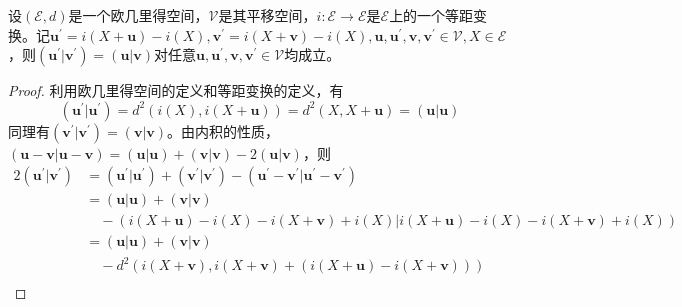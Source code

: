 \documentclass[main.tex]{subfiles}
\begin{document}
\begin{lemma}\label{thm:isom_l1}
    设$\left(\mathcal{E},d\right)$是一个欧几里得空间，$\mathcal{V}$是其平移空间，$i:\mathcal{E}\rightarrow\mathcal{E}$是$\mathcal{E}$上的一个等距变换。记$\mathbf{u}^\prime=i\left(X+\mathbf{u}\right)-i\left(X\right),\mathbf{v}^\prime=i\left(X+\mathbf{v}\right)-i\left(X\right),\mathbf{u},\mathbf{u}^\prime,\mathbf{v},\mathbf{v}^\prime\in\mathcal{V},X\in\mathcal{E}$，则$\left(\mathbf{u}^\prime|\mathbf{v}^\prime\right)=\left(\mathbf{u}|\mathbf{v}\right)$对任意$\mathbf{u},\mathbf{u}^\prime,\mathbf{v},\mathbf{v}^\prime\in\mathcal{V}$均成立。
\end{lemma}
\begin{proof}
    利用欧几里得空间的定义和等距变换的定义，有
    \[
        \left(\mathbf{u}^\prime|\mathbf{u}^\prime\right)=d^2\left(i\left(X\right),i\left(X+\mathbf{u}\right)\right)=d^2\left(X,X+\mathbf{u}\right)=\left(\mathbf{u}|\mathbf{u}\right)
    \]
    同理有$\left(\mathbf{v}^\prime|\mathbf{v}^\prime\right)=\left(\mathbf{v}|\mathbf{v}\right)$。由内积的性质，$\left(\mathbf{u}-\mathbf{v}|\mathbf{u}-\mathbf{v}\right)=\left(\mathbf{u}|\mathbf{u}\right)+\left(\mathbf{v}|\mathbf{v}\right)-2\left(\mathbf{u}|\mathbf{v}\right)$，则
    \begin{align*}
        2\left(\mathbf{u}^\prime|\mathbf{v}^\prime\right) & =\left(\mathbf{u}^\prime|\mathbf{u}^\prime\right)+\left(\mathbf{v}^\prime|\mathbf{v}^\prime\right)-\left(\mathbf{u}^\prime-\mathbf{v}^\prime|\mathbf{u}^\prime-\mathbf{v}^\prime\right)        \\
                                                          & =\left(\mathbf{u}|\mathbf{u}\right)+\left(\mathbf{v}|\mathbf{v}\right)                                                                                                                         \\
                                                          & \quad-\left(i\left(X+\mathbf{u}\right)-i\left(X\right)-i\left(X+\mathbf{v}\right)+i\left(X\right)|i\left(X+\mathbf{u}\right)-i\left(X\right)-i\left(X+\mathbf{v}\right)+i\left(X\right)\right) \\
                                                          & =\left(\mathbf{u}|\mathbf{u}\right)+\left(\mathbf{v}|\mathbf{v}\right)                                                                                                                         \\
                                                          & \quad-d^2\left(i\left(X+\mathbf{v}\right),i\left(X+\mathbf{v}\right)+\left(i\left(X+\mathbf{u}\right)-i\left(X+\mathbf{v}\right)\right)\right)                                                 \\

\end{align*}
\end{proof}
\end{document}

